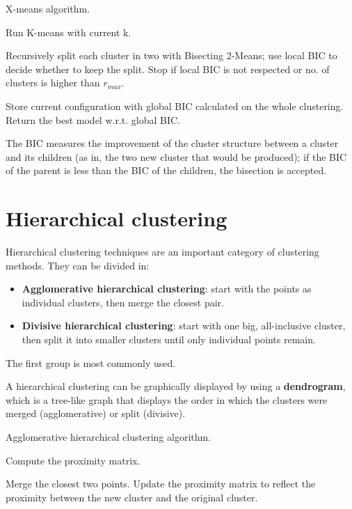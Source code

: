 \begin{algorithm}
\caption{X-means algorithm.}
\begin{algorithmic}[1]
        \State Run K-means with current k.
        
        \State Recursively split each cluster in two with Bisecting 2-Means; use local BIC to decide whether to keep the split. Stop if local BIC is not respected or no. of clusters is higher than $r_{max}$.

        \State Store current configuration with global BIC calculated on the whole clustering.
    \EndFor
    \State Return the best model w.r.t. global BIC.
\end{algorithmic}
\end{algorithm}

The BIC measures the improvement of the cluster structure between a cluster and its children (as in, the two new cluster that would be produced); if the BIC of the parent is less than the BIC of the children, the bisection is accepted.

\section{Hierarchical clustering}

Hierarchical clustering techniques are an important category of clustering methods. They can be divided in:

\begin{itemize}
    \item \textbf{Agglomerative hierarchical clustering}: start with the points as individual clusters, then merge the closest pair.

    \item \textbf{Divisive hierarchical clustering}: start with one big, all-inclusive cluster, then split it into smaller clusters until only individual points remain.
\end{itemize}

The first group is most commonly used.

A hierarchical clustering can be graphically displayed by using a \textbf{dendrogram}, which is a tree-like graph that displays the order in which the clusters were merged (agglomerative) or split (divisive).

\begin{algorithm}
\caption{Agglomerative hierarchical clustering algorithm.}
\begin{algorithmic}[1]
    \State Compute the proximity matrix.

    \Repeat
        \State Merge the closest two points.
        \State Update the proximity matrix to reflect the proximity between the new cluster and the original cluster.
\end{algorithmic}
\end{algorithm}

